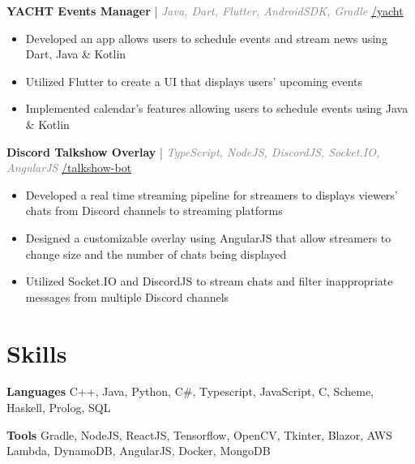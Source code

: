 \documentclass[11pt]{article}
\begin{document}
\hspace{10pt}\textbf{YACHT Events Manager} {\small | \textit{\textcolor{gray}{Java, Dart, Flutter, AndroidSDK, Gradle}}} \hfill {\small \href{https://github.com/huynd2001/yacht}{\faGithub{}/yacht}}
  \begin{itemize}[leftmargin=31pt]
  \vspace{-10pt}
    \setlength\itemsep{-5pt}
      \item {\small Developed an app allows users to schedule events and stream news using Dart, Java \& Kotlin}
      \item {\small Utilized Flutter to create a UI that displays users' upcoming events}
      \item {\small Implemented calendar's features allowing users to schedule events using Java \& Kotlin}
      \vspace{-5pt}
  \end{itemize}
 
  \hspace{10pt}\textbf{Discord Talkshow Overlay} {\small | \textit{\textcolor{gray}{TypeScript, NodeJS, DiscordJS, Socket.IO, AngularJS}}} \hfill {\small \href{https://github.com/huynd2001/talkshow-bot}{\faGithub{}/talkshow-bot}}
  \begin{itemize}[leftmargin=31pt]
  \vspace{-10pt}
    \setlength\itemsep{-5pt}
      \item {\small Developed a real time streaming pipeline for streamers to displays viewers' chats from Discord channels to streaming platforms }
      \item {\small Designed a customizable overlay using AngularJS that allow streamers to change size and the number of chats being displayed}
      \item {\small Utilized Socket.IO and DiscordJS to stream chats and filter inappropriate messages from multiple Discord channels}
      \vspace{-5pt}
  \end{itemize}

\section{Skills}
    \hspace{10pt}\textbf{Languages} {\small C++, Java, Python, C\#, Typescript, JavaScript, C, Scheme, Haskell, Prolog, SQL}

    \hspace{10pt}\textbf{Tools} {\small Gradle, NodeJS, ReactJS, Tensorflow, OpenCV, Tkinter, Blazor, AWS Lambda, DynamoDB, AngularJS, Docker, MongoDB}
\end{document}
